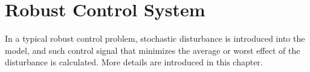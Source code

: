 \chapter{Robust Control System}

In a typical robust control problem, stochastic disturbance is introduced into the model, and such control signal that minimizes the average or worst effect of the disturbance is calculated. More details are introduced in this chapter. 